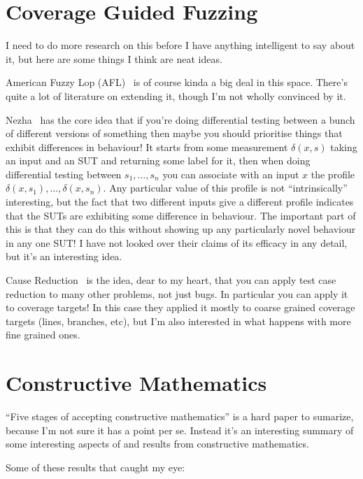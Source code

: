 \documentclass[a4paper]{book}
\begin{document}
\section{Coverage Guided Fuzzing}

I need to do more research on this before I have anything intelligent to say about it,
but here are some things I think are neat ideas.

American Fuzzy Lop (AFL)~\cite{AFL} is of course kinda a big deal in this space.
There's quite a lot of literature on extending it,
though I'm not wholly convinced by it.

Nezha~\cite{DBLP:conf/sp/PetsiosTSKJ17} has the core idea that if you're doing differential testing between a bunch of different versions of something then maybe you should prioritise things that exhibit differences in behaviour!
It starts from some measurement \(\delta(x, s)\) taking an input and an SUT and returning some label for it,
then when doing differential testing between \(s_1, \ldots, s_n\) you can associate with an input \(x\) the profile \(\delta(x, s_1), \ldots, \delta(x, s_n)\).
Any particular value of this profile is not ``intrinsically'' interesting,
but the fact that two different inputs give a different profile indicates that the SUTs are exhibiting some difference in behaviour.
The important part of this is that they can do this without showing up any particularly novel behaviour in any one SUT!\@
I have not looked over their claims of its efficacy in any detail,
but it's an interesting idea.

Cause Reduction~\cite{DBLP:journals/stvr/GroceAZCR16} is the idea,
dear to my heart,
that you can apply test case reduction to many other problems,
not just bugs.
In particular you can apply it to coverage targets!
In this case they applied it mostly to coarse grained coverage targets (lines, branches, etc),
but I'm also interested in what happens with more fine grained ones.

\section{Constructive Mathematics}

``Five stages of accepting constructive mathematics''\cite{bauer2017five} is a hard paper to sumarize,
because I'm not sure it has a point per se.
Instead it's an interesting summary of some interesting aspects of and results from constructive mathematics.

Some of these results that caught my eye:
\end{document}
